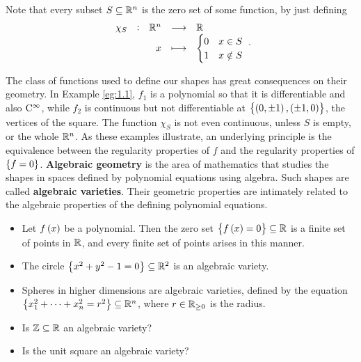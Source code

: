 \begin{remark}
Note that every subset $ S \subseteq \mathbb{R}^n $ is the zero set of some function, by just defining
$$ \function[\chi_S]{\RR^n}{\RR}{x}{
\begin{cases}
0 & x \in S \\
1 & x \notin S
\end{cases}
}. $$
\end{remark}

The class of functions used to define our shapes has great consequences on their geometry. In Example \ref{eg:1.1}, $ f_1 $ is a polynomial so that it is differentiable and also $ \mathrm{C}^\infty $, while $ f_2 $ is continuous but not differentiable at $ \cbr{\br{0, \pm 1}, \br{\pm 1, 0}} $, the vertices of the square. The function $ \chi_S $ is not even continuous, unless $ S $ is empty, or the whole $ \mathbb{R}^n $. As these examples illustrate, an underlying principle is the equivalence between the regularity properties of $ f $ and the regularity properties of $ \cbr{f = 0} $. \textbf{Algebraic geometry} is the area of mathematics that studies the shapes in spaces defined by polynomial equations using algebra. Such shapes are called \textbf{algebraic varieties}. Their geometric properties are intimately related to the algebraic properties of the defining polynomial equations.

\begin{example}
\hfill
\begin{itemize}
\item Let $ f\br{x} $ be a polynomial. Then the zero set $ \cbr{f\br{x} = 0} \subseteq \RR $ is a finite set of points in $ \mathbb{R} $, and every finite set of points arises in this manner.
\item The circle $ \cbr{x^2 + y^2 - 1 = 0} \subseteq \RR^2 $ is an algebraic variety.
\item Spheres in higher dimensions are algebraic varieties, defined by the equation $ \cbr{x_1^2 + \dots + x_n^2 = r^2} \subseteq \RR^n $, where $ r \in \mathbb{R}_{\ge 0} $ is the radius.
\end{itemize}
\end{example}

\begin{exercise**}
\hfill
\begin{itemize}
\item Is $ \mathbb{Z} \subseteq \mathbb{R} $ an algebraic variety?
\item Is the unit square an algebraic variety?
\end{itemize}
\end{exercise**}

